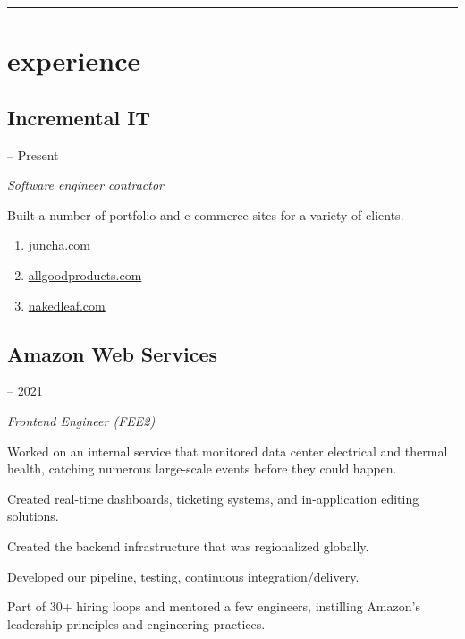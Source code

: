 \setlength{\parindent}{0cm}
\setlength{\parskip}{0.5em}

\begin{samepage}
  \hrule
  \section*{experience}
\end{samepage}

\noindent\begin{minipage}[t]{0.5\textwidth}
  \subsection*{Incremental IT}
\end{minipage}
\noindent\begin{minipage}[t]{0.5\textwidth}
   -- Present
\end{minipage}

\emph{Software engineer contractor}

\begin{itemize}
  {\small
  \item Built a number of portfolio and e-commerce sites for a variety of
  clients.
  \begin{enumerate}
    \item \href{https://juncha.com}{juncha.com}
    \item \href{https://allgoodproducts.com}{allgoodproducts.com}
    \item \href{https://nakedleaf.com}{nakedleaf.com}
  \end{enumerate}
  }
\end{itemize}

\noindent\begin{minipage}[t]{0.5\textwidth}
  \subsection*{Amazon Web Services}
\end{minipage}
\noindent\begin{minipage}[t]{0.5\textwidth}
   -- 2021
\end{minipage}

\emph{Frontend Engineer (FEE2)}

\begin{itemize}
  {\small
  \item Worked on an internal service that monitored data center electrical and
    thermal health, catching numerous large-scale events before they could
    happen.
  \item Created real-time dashboards, ticketing systems, and in-application
    editing solutions.
  \item Created the backend infrastructure that was regionalized globally.
  \item Developed our pipeline, testing, continuous integration/delivery.
  \item Part of 30+ hiring loops and mentored a few engineers, instilling
    Amazon's leadership principles and engineering practices.
  }
\end{itemize}

